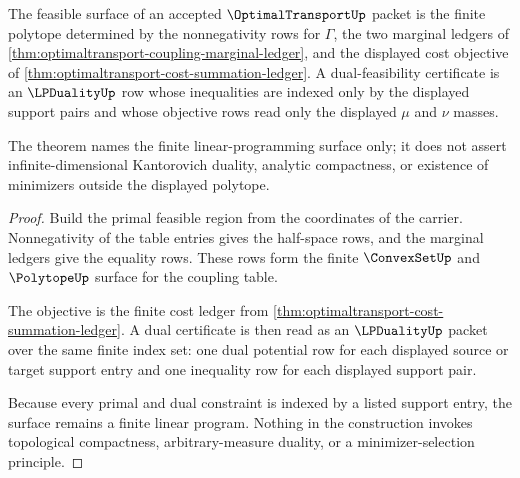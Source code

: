 \begin{theorem}
\label{thm:optimaltransport-lpduality-feasible-surface}
The feasible surface of an accepted $\OptimalTransportUp$ packet is the finite polytope determined by the nonnegativity rows for $\Gamma$, the two marginal ledgers of \autoref{thm:optimaltransport-coupling-marginal-ledger}, and the displayed cost objective of \autoref{thm:optimaltransport-cost-summation-ledger}. A dual-feasibility certificate is an $\LPDualityUp$ row whose inequalities are indexed only by the displayed support pairs and whose objective rows read only the displayed $\mu$ and $\nu$ masses.

The theorem names the finite linear-programming surface only; it does not assert infinite-dimensional Kantorovich duality, analytic compactness, or existence of minimizers outside the displayed polytope.
\end{theorem}
\begin{proof}
Build the primal feasible region from the coordinates of the carrier. Nonnegativity of the table entries gives the half-space rows, and the marginal ledgers give the equality rows. These rows form the finite $\ConvexSetUp$ and $\PolytopeUp$ surface for the coupling table.

The objective is the finite cost ledger from \autoref{thm:optimaltransport-cost-summation-ledger}. A dual certificate is then read as an $\LPDualityUp$ packet over the same finite index set: one dual potential row for each displayed source or target support entry and one inequality row for each displayed support pair.

Because every primal and dual constraint is indexed by a listed support entry, the surface remains a finite linear program. Nothing in the construction invokes topological compactness, arbitrary-measure duality, or a minimizer-selection principle.
\end{proof}

